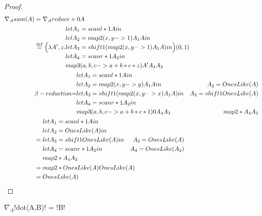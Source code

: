  \begin{proof}

\begin{align*}
    \nabla_A sum(A) 
    &= \nabla_A reduce + 0 A \\
    & \stackrel {\mathrm{def}}= \Big(\lambda A',z.
    \begin{aligned}
        & let A_1 = scanl * 1 A in \\
        & let A_2 = map2 (x,y -> 1) A_1 A in \\
        & let A_3 = shift1 (map2 (x,y -> 1) A_1 A) in \\
        & let A_4 = scanr * 1 A_2 in \\
        & map3 (a,b,c -> a+b*c*z) A' A_4 A_3
    \end{aligned}
    \Big)(0,1)\\
    &{\beta-reduction}{=}
    \begin{aligned}
        & let A_1 = scanl * 1 A in &\\
        & let A_2 = map2 (x,y -> y) A_1 A in & A_2= OnesLike(A) \\
        & let A_3 = shift1 (map2 (x,y -> x) A_1 A) in & A_3 = shift1 OnesLike(A)\\
        & let A_4 = scanr * 1 A_2 in & \\
        & map3 (a,b,c -> a+b*c*1) 0 A_4 A_3 & map2 * A_4 A_3
    \end{aligned}\\
    &= \begin{aligned}
        & let A_1 = scanl * 1 A in & \\
        & let A_2= OnesLike(A) in &  \\
        & let A_3 = shift1 OnesLike(A) in & A_3 = OnesLike(A) \\
        & let A_4 = scanr * 1 A_2 in & A_4 = OnesLike(A_2) \\
        & map2 * A_4 A_3 &
    \end{aligned}\\
    &= map2 * OnesLike(A) OnesLike(A) \\
    &= OnesLike(A)
\end{align*}
 \end{proof}

 \begin{lemma}
     $\nabla_A$!dot(A,B)! = !B! 
 \end{lemma}

